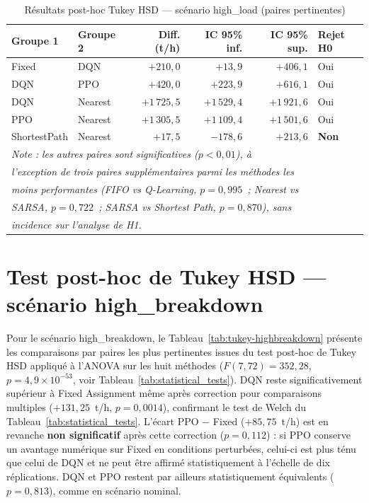 \documentclass[11pt,a4paper]{report}
\begin{document}
\begin{table}[H]
\centering
\caption{Résultats post-hoc Tukey HSD — scénario high\_load (paires pertinentes)}
\label{tab:tukey-highload}
\small
\begin{tabular}{llrrrl}
\toprule
\textbf{Groupe 1} & \textbf{Groupe 2} & \textbf{Diff. (t/h)} & \textbf{IC 95\% inf.} & \textbf{IC 95\% sup.} & \textbf{Rejet H0} \\
\midrule
Fixed & DQN          & $+210{,}0$    & $+13{,}9$    & $+406{,}1$   & Oui \\
DQN   & PPO          & $+420{,}0$    & $+223{,}9$   & $+616{,}1$   & Oui \\
DQN   & Nearest      & $+1\,725{,}5$ & $+1\,529{,}4$ & $+1\,921{,}6$ & Oui \\
PPO   & Nearest      & $+1\,305{,}5$ & $+1\,109{,}4$ & $+1\,501{,}6$ & Oui \\
ShortestPath & Nearest & $+17{,}5$   & $-178{,}6$   & $+213{,}6$   & \textbf{Non} \\
\midrule
\multicolumn{6}{l}{\textit{Note : les autres paires sont significatives ($p < 0{,}01$), à}} \\
\multicolumn{6}{l}{\textit{l'exception de trois paires supplémentaires parmi les méthodes les}} \\
\multicolumn{6}{l}{\textit{moins performantes (FIFO vs Q-Learning, $p = 0{,}995$~; Nearest vs}} \\
\multicolumn{6}{l}{\textit{SARSA, $p = 0{,}722$~; SARSA vs Shortest Path, $p = 0{,}870$), sans}} \\
\multicolumn{6}{l}{\textit{incidence sur l'analyse de H1.}} \\
\bottomrule
\end{tabular}
\end{table}

\section*{Test post-hoc de Tukey HSD — scénario high\_breakdown}

Pour le scénario high\_breakdown, le Tableau~\ref{tab:tukey-highbreakdown}
présente les comparaisons par paires les plus pertinentes issues du
test post-hoc de Tukey HSD appliqué à l'ANOVA sur les huit méthodes
($F(7,72) = 352{,}28$, $p = 4{,}9 \times 10^{-53}$, voir Tableau~\ref{tab:statistical_tests}).
DQN reste significativement supérieur à Fixed Assignment même après
correction pour comparaisons multiples ($+131{,}25$~t/h,
$p = 0{,}0014$), confirmant le test de Welch du Tableau~\ref{tab:statistical_tests}.
L'écart PPO $-$ Fixed ($+85{,}75$~t/h) est en revanche \textbf{non
significatif} après cette correction ($p = 0{,}112$) : si PPO conserve
un avantage numérique sur Fixed en conditions perturbées, celui-ci est
plus ténu que celui de DQN et ne peut être affirmé statistiquement à
l'échelle de dix réplications. DQN et PPO restent par ailleurs
statistiquement équivalents ($p = 0{,}813$), comme en scénario nominal.
\end{document}
